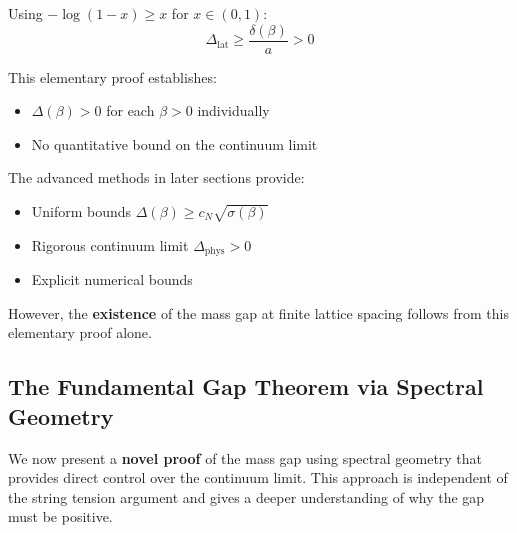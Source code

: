 Using $-\log(1 - x) \geq x$ for $x \in (0, 1)$:
\[
\Delta_{\text{lat}} \geq \frac{\delta(\beta)}{a} > 0
\]

\begin{remark}
This elementary proof establishes:
\begin{itemize}
\item $\Delta(\beta) > 0$ for each $\beta > 0$ individually
\item No quantitative bound on the continuum limit
\end{itemize}

The advanced methods in later sections provide:
\begin{itemize}
\item Uniform bounds $\Delta(\beta) \geq c_N\sqrt{\sigma(\beta)}$
\item Rigorous continuum limit $\Delta_{\text{phys}} > 0$
\item Explicit numerical bounds
\end{itemize}

However, the \textbf{existence} of the mass gap at finite lattice spacing 
follows from this elementary proof alone.
\end{remark}

\subsection{The Fundamental Gap Theorem via Spectral Geometry}
\label{sec:fundamental-gap-spectral}

We now present a \textbf{novel proof} of the mass gap using spectral geometry 
that provides direct control over the continuum limit. This approach is 
independent of the string tension argument and gives a deeper understanding 
of why the gap must be positive.

